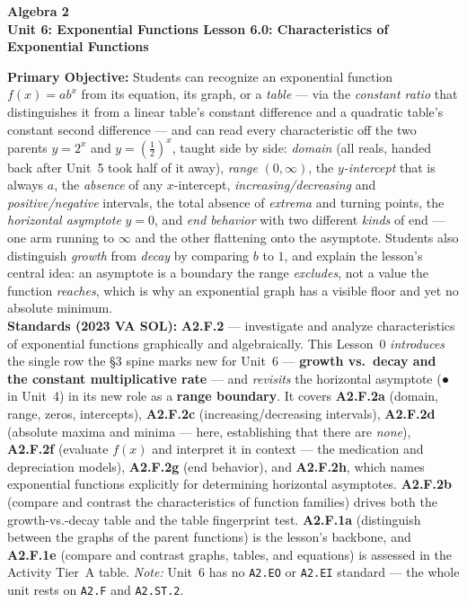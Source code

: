 \documentclass[10pt]{article}
\newcommand{\CourseName}{Algebra 2}
\newcommand{\UnitNumberName}{Unit 6: Exponential Functions \quad}
\newcommand{\LessonNumberName}{Lesson 6.0: Characteristics of Exponential Functions}
\begin{document}
\begin{center}
    {\Large\bfseries \CourseName \\
    {\small\bfseries \UnitNumberName \LessonNumberName}}
\end{center}

\begin{tcolorbox}[colback=forestbg, colframe=forest, boxrule=0.9pt, arc=2mm,
    left=2mm, right=2mm, top=1.5mm, bottom=1.5mm]
    \textbf{Primary Objective:} Students can recognize an exponential function $f(x)=ab^{x}$ from its
    equation, its graph, or a \emph{table} --- via the \emph{constant ratio} that distinguishes it
    from a linear table's constant difference and a quadratic table's constant second difference ---
    and can read every characteristic off the two parents $y=2^{x}$ and $y=\left(\frac12\right)^{x}$,
    taught side by side: \emph{domain} (all reals, handed back after Unit~5 took half of it away),
    \emph{range} $(0,\infty)$, the \emph{$y$-intercept} that is always $a$, the \emph{absence} of any
    $x$-intercept, \emph{increasing/decreasing} and \emph{positive/negative} intervals, the total
    absence of \emph{extrema} and turning points, the \emph{horizontal asymptote} $y=0$, and
    \emph{end behavior} with two different \emph{kinds} of end --- one arm running to $\infty$ and
    the other flattening onto the asymptote. Students also distinguish \emph{growth} from
    \emph{decay} by comparing $b$ to $1$, and explain the lesson's central idea: an asymptote is a
    boundary the range \emph{excludes}, not a value the function \emph{reaches}, which is why an
    exponential graph has a visible floor and yet no absolute minimum.
    \\[2pt]
    \textbf{Standards (2023 VA SOL):} \textbf{A2.F.2} --- investigate and analyze characteristics of
    exponential functions graphically and algebraically. This Lesson~0 \emph{introduces} the single
    row the \S3 spine marks new for Unit~6 --- \textbf{growth vs.\ decay and the constant
    multiplicative rate} --- and \emph{revisits} the horizontal asymptote (\textbf{●} in Unit~4) in
    its new role as a \textbf{range boundary}. It covers \textbf{A2.F.2a} (domain, range, zeros,
    intercepts), \textbf{A2.F.2c} (increasing/decreasing intervals), \textbf{A2.F.2d} (absolute
    maxima and minima --- here, establishing that there are \emph{none}), \textbf{A2.F.2f} (evaluate
    $f(x)$ and interpret it in context --- the medication and depreciation models),
    \textbf{A2.F.2g} (end behavior), and \textbf{A2.F.2h}, which names exponential functions
    explicitly for determining horizontal asymptotes. \textbf{A2.F.2b} (compare and contrast the
    characteristics of function families) drives both the growth-vs.-decay table and the table
    fingerprint test. \textbf{A2.F.1a} (distinguish between the graphs of the parent functions) is
    the lesson's backbone, and \textbf{A2.F.1e} (compare and contrast graphs, tables, and equations)
    is assessed in the Activity Tier~A table. \emph{Note:} Unit~6 has no \texttt{A2.EO} or
    \texttt{A2.EI} standard --- the whole unit rests on \texttt{A2.F} and \texttt{A2.ST.2}.
\end{tcolorbox}
\end{document}
